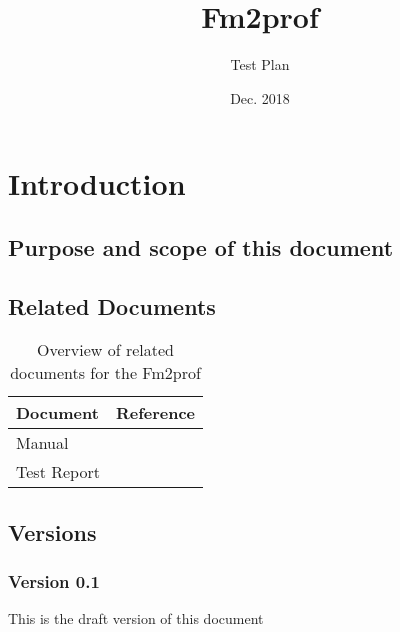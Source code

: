 \documentclass[signature]{deltares_report}
\begin{document}
\pagestyle{empty}
\cleardoublepage
%

\newcommand{\ProgramName}{Fm2prof\xspace}

\title{\ProgramName}
\subtitle{Test Plan}
\classification{-}

\date{Dec. 2018}



\summary{}

\authori{}
\revieweri{}
\approvali{}

\disclaimer{}

\deltarestitle


\chapter{Introduction} 
\label{chapterIntroduction}

\section{Purpose and scope of this document} \label{sec:PurposeAndScope}

\section{Related Documents}
\label{sec:RelatedDocuments}
\bigskip
\begin{longtable}{|p{}|p{}|}
\caption{Overview of related documents for the \ProgramName \label{tab:RelatedDocuments}}\\	\hline
		\hline 
		\textbf{Document} & \textbf{Reference} \\
		\hline 
		\hline 
		Manual & \citep{Fm2prof_Manual2018} \\
		Test Report & \citep{Fm2prof_TestReport2018}  \\
    \hline			
\end{longtable}

\section{Versions}
\label{sec:Versions}

\subsection{Version 0.1}
\label{sec:Version}
This is the draft version of this document
\end{document}
